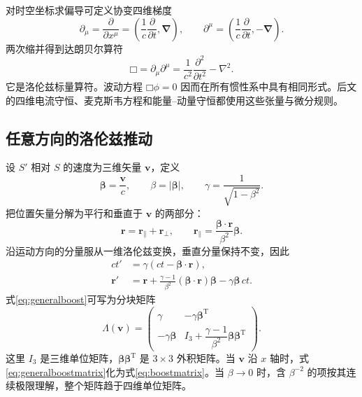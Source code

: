 \documentclass[style=classic,color=full]{lc-article}
\begin{document}
对时空坐标求偏导可定义协变四维梯度
\begin{equation}
  \partial_\mu
  =\frac{\partial}{\partial x^\mu}
  =\left(\frac{1}{c}\frac{\partial}{\partial t},\bm\nabla\right),
  \qquad
  \partial^\mu
  =\left(\frac{1}{c}\frac{\partial}{\partial t},-\bm\nabla\right).
  \label{eq:fourgradient}
\end{equation}
两次缩并得到达朗贝尔算符
\begin{equation}
  \mdlgwhtsquare=\partial_\mu\partial^\mu
  =\frac{1}{c^2}\frac{\partial^2}{\partial t^2}-\nabla^2.
  \label{eq:dalembertian}
\end{equation}
它是洛伦兹标量算符。波动方程 $\mdlgwhtsquare\phi=0$ 因而在所有惯性系中具有相同形式。后文的四维电流守恒、麦克斯韦方程和能量--动量守恒都使用这些张量与微分规则。

\subsection{任意方向的洛伦兹推动}

设 $S'$ 相对 $S$ 的速度为三维矢量 $\bm v$，定义
\begin{equation}
  \bm\beta=\frac{\bm v}{c},\qquad
  \beta=\lvert\bm\beta\rvert,\qquad
  \gamma=\frac{1}{\sqrt{1-\beta^2}}.
\end{equation}
把位置矢量分解为平行和垂直于 $\bm v$ 的两部分：
\begin{equation}
  \bm r=\bm r_{\parallel}+\bm r_{\perp},
  \qquad
  \bm r_{\parallel}
  =\frac{\bm\beta\mathbin{\cdot}\bm r}{\beta^2}\bm\beta.
\end{equation}
沿运动方向的分量服从一维洛伦兹变换，垂直分量保持不变，因此
\begin{equation}
  \begin{aligned}
    ct'&=\gamma\left(ct-\bm\beta\mathbin{\cdot}\bm r\right),\\
    \bm r'&=\bm r
    +\frac{\gamma-1}{\beta^2}
      (\bm\beta\mathbin{\cdot}\bm r)\bm\beta
    -\gamma\bm\beta\,ct.
  \end{aligned}
  \label{eq:generalboost}
\end{equation}
式\eqref{eq:generalboost}可写为分块矩阵
\begin{equation}
  \Lambda(\bm v)=
  \begin{pmatrix}
    \gamma & -\gamma\bm\beta^{\mathrm T}\\[0.3em]
    -\gamma\bm\beta &
    I_3+\dfrac{\gamma-1}{\beta^2}
    \bm\beta\bm\beta^{\mathrm T}
  \end{pmatrix}.
  \label{eq:generalboostmatrix}
\end{equation}
这里 $I_3$ 是三维单位矩阵，$\bm\beta\bm\beta^{\mathrm T}$ 是 $3\times3$ 外积矩阵。当 $\bm v$ 沿 $x$ 轴时，式\eqref{eq:generalboostmatrix}化为式\eqref{eq:boostmatrix}。当 $\beta\to0$ 时，含 $\beta^{-2}$ 的项按其连续极限理解，整个矩阵趋于四维单位矩阵。
\end{document}
